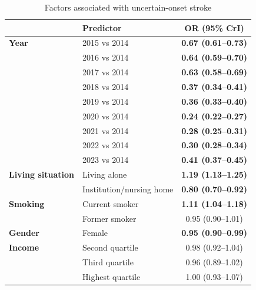 \begin{table}[htbp]
  \caption{Factors associated with uncertain-onset stroke}
  \label{tab:full_model}
  \small
  \begin{threeparttable}

    \begin{tabularx}{\textwidth}{@{}XXc@{}}
      \toprule
       & \textbf{Predictor}       & \textbf{OR (95\% CrI)}     \\
      \midrule

      \textbf{Year}
       & 2015 vs 2014             & \textbf{0.67 (0.61--0.73)} \\
       & 2016 vs 2014             & \textbf{0.64 (0.59--0.70)} \\
       & 2017 vs 2014             & \textbf{0.63 (0.58--0.69)} \\
       & 2018 vs 2014             & \textbf{0.37 (0.34--0.41)} \\
       & 2019 vs 2014             & \textbf{0.36 (0.33--0.40)} \\
       & 2020 vs 2014             & \textbf{0.24 (0.22--0.27)} \\
       & 2021 vs 2014             & \textbf{0.28 (0.25--0.31)} \\
       & 2022 vs 2014             & \textbf{0.30 (0.28--0.34)} \\
       & 2023 vs 2014             & \textbf{0.41 (0.37--0.45)} \\

      \addlinespace
      \textbf{Living situation}
       & Living alone             & \textbf{1.19 (1.13--1.25)} \\
       & Institution/nursing home & \textbf{0.80 (0.70--0.92)} \\

      \addlinespace
      \textbf{Smoking}
       & Current smoker           & \textbf{1.11 (1.04--1.18)} \\
       & Former smoker            & 0.95 (0.90--1.01)          \\

      \addlinespace
      \textbf{Gender}
       & Female                   & \textbf{0.95 (0.90--0.99)} \\

      \addlinespace
      \textbf{Income}
       & Second quartile          & 0.98 (0.92--1.04)          \\
       & Third quartile           & 0.96 (0.89--1.02)          \\
       & Highest quartile         & 1.00 (0.93--1.07)          \\


\end{tabularx}
\end{threeparttable}
\end{table}
